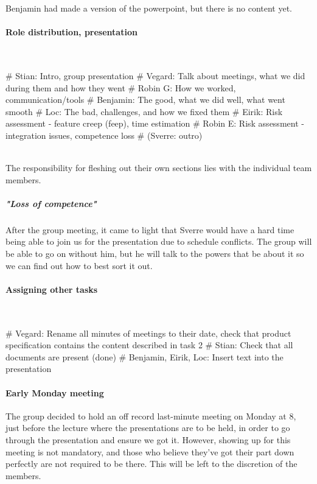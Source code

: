 \documentclass{article}
\begin{document}
Benjamin had made a version of the powerpoint, but there is no content yet.

\paragraph{Role distribution, presentation}\mbox{}\\

\begin{easylist}[itemize]
        # Stian: Intro, group presentation
        # Vegard: Talk about meetings, what we did during them and how they went
        # Robin G: How we worked, communication/tools
        # Benjamin: The good, what we did well, what went smooth
        # Loc: The bad, challenges, and how we fixed them
        # Eirik: Risk assessment - feature creep (feep), time estimation
        # Robin E: Risk assessment - integration issues, competence loss
        # (Sverre: outro)
\end{easylist}\mbox{}\\

The responsibility for fleshing out their own sections lies with the individual team members.

\subparagraph{"Loss of competence"}

After the group meeting, it came to light that Sverre would have a hard time being able to join us for the presentation due to schedule conflicts. The group will be able to go on without him, but he will talk to the powers that be about it so we can find out how to best sort it out.

\paragraph{Assigning other tasks}\mbox{}\\

\begin{easylist}[itemize]
    # Vegard: Rename all minutes of meetings to their date, check that product specification contains the content described in task 2
    # Stian: Check that all documents are present (done)
    # Benjamin, Eirik, Loc: Insert text into the presentation
\end{easylist}

\paragraph{Early Monday meeting}

The group decided to hold an off record last-minute meeting on Monday at 8, just before the lecture where the presentations are to be held, in order to go through the presentation and ensure we got it. However, showing up for this meeting is not mandatory, and those who believe they've got their part down perfectly are not required to be there. This will be left to the discretion of the members.
\end{document}
